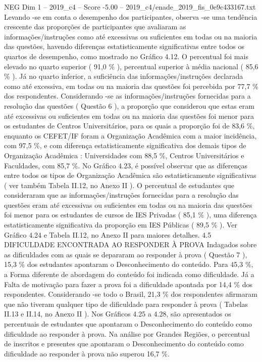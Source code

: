 \begin{textsample}{NEG Dim 1 – 2019\_c4 – Score -5.00 – 2019\_c4/enade\_2019\_fis\_0e9c433167.txt}
Levando -se em conta o desempenho dos participantes, observa -se uma tendência crescente das proporções de participantes que avaliaram as informações/instruções como até excessivas ou suficientes em todas ou na maioria das questões, havendo diferenças estatisticamente significativas entre todos os quartos de desempenho, como mostrado no Gráfico 4.12.
O percentual foi mais elevado no quarto superior ( 91,0 \% ), percentual superior à média nacional ( 85,6 \% ).
Já no quarto inferior, a suficiência das informações/instruções declarada como até excessiva, em todas ou na maioria das questões foi percebida por 77,7 \% dos respondentes.
Considerando -se as informações/instruções fornecidas para a resolução das questões ( Questão 6 ), a proporção que considerou que estas eram até excessivas ou suficientes em todas ou na maioria das questões foi menor para os estudantes de Centros Universitários, para os quais a proporção foi de 83,6 \%, enquanto os CEFET/IF foram a Organização Acadêmica com a maior incidência, com 97,5 \%, e com diferença estatisticamente significativa dos demais tipos de Organização Acadêmica : Universidades com 88,5 \%, Centros Universitários e Faculdades, com 85,7 \%.
No Gráfico 4.23, é possível observar que as diferenças entre todos os tipos de Organização Acadêmica são estatisticamente significativas ( ver também Tabela II.12, no Anexo II ).
O percentual de estudantes que consideraram que as informações/instruções fornecidas para a resolução das questões eram até excessivas ou suficientes em todas ou na maioria das questões foi menor para os estudantes de cursos de IES Privadas ( 85,1 \% ), uma diferença estatisticamente significativa da proporção em IES Públicas ( 89,5 \% ).
Ver Gráfico 4.24 e Tabela II.12, no Anexo II para maiores detalhes. 4.5 DIFICULDADE ENCONTRADA AO RESPONDER À PROVA Indagados sobre as dificuldades com as quais se depararam ao responder à prova ( Questão 7 ), 15,3 \% dos estudantes apontaram o Desconhecimento do conteúdo.
Para 45,3 \%, a Forma diferente de abordagem do conteúdo foi indicada como dificuldade.
Já a Falta de motivação para fazer a prova foi a dificuldade apontada por 14,4 \% dos respondentes.
Considerando -se todo o Brasil, 21,3 \% dos respondentes afirmaram que não tiveram qualquer tipo de dificuldade para responder à prova ( Tabelas II.13 e II.14, no Anexo II ).
Nos Gráficos 4.25 a 4.28, são apresentados os percentuais de estudantes que apontaram o Desconhecimento do conteúdo como dificuldade ao responder à prova.
Na análise por Grandes Regiões, o percentual de inscritos e presentes que apontaram o Desconhecimento do conteúdo como dificuldade ao responder à prova não superou 16,7 \%.

\end{textsample}

